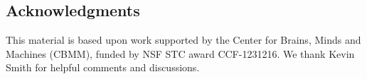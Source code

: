 
\subsection*{Acknowledgments}
This material is based upon work supported by the Center for Brains, Minds and Machines (CBMM), funded by NSF STC award CCF-1231216. We thank Kevin Smith for helpful comments and discussions.


